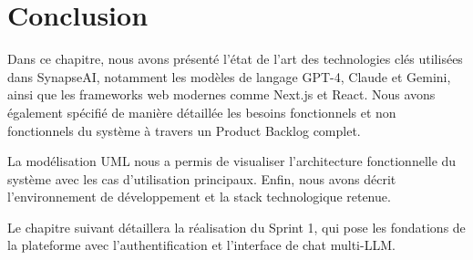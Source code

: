 \section{Conclusion}

Dans ce chapitre, nous avons présenté l'état de l'art des technologies clés utilisées dans SynapseAI, notamment les modèles de langage GPT-4, Claude et Gemini, ainsi que les frameworks web modernes comme Next.js et React. Nous avons également spécifié de manière détaillée les besoins fonctionnels et non fonctionnels du système à travers un Product Backlog complet.

La modélisation UML nous a permis de visualiser l'architecture fonctionnelle du système avec les cas d'utilisation principaux. Enfin, nous avons décrit l'environnement de développement et la stack technologique retenue.

Le chapitre suivant détaillera la réalisation du Sprint 1, qui pose les fondations de la plateforme avec l'authentification et l'interface de chat multi-LLM.

